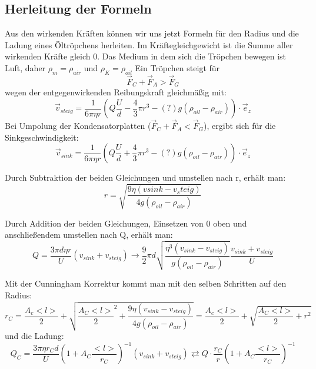 \documentclass{scrartcl}
\begin{document}
		\subsection{Herleitung der Formeln}
			Aus den wirkenden Kräften können wir uns jetzt Formeln für den Radius und die Ladung eines Öltröpchens herleiten.
			Im Kräftegleichgewicht ist die Summe aller wirkenden Kräfte gleich 0.
			Das Medium in dem sich die Tröpchen bewegen ist Luft, daher	$\rho_m  = \rho_{air}$ und $\rho_K = \rho_{oil}$
			Ein Tröpchen steigt für
			\begin{equation}
				\vec{F}_C + \vec{F}_A > \vec{F}_G
			\end{equation}
			wegen der entgegenwirkenden  Reibungskraft gleichmäßig mit:
			\begin{equation}
				\vec{v}_{steig} = \frac{1}{6\pi \eta r} (Q \frac{U}{d} - \frac{4}{3}\pi r^3 -(?)g (\rho_{oil}-\rho_{air})) \cdot \vec{e}_z
			\end{equation}
			Bei Umpolung der Kondensatorplatten ($\vec{F}_C + \vec{F}_A < \vec{F}_G$), ergibt sich für die Sinkgeschwindigkeit:
			\begin{equation}
				\vec{v}_{sink} = \frac{1}{6\pi \eta r} (Q \frac{U}{d} + \frac{4}{3}\pi r^3 -(?)g (\rho_{oil}-\rho_{air})) \cdot \vec{e}_z
			\end{equation}

			Durch Subtraktion der beiden Gleichungen und umstellen nach r, erhält man:
			\begin{equation}
				r = \sqrt{\frac{9 \eta (v{sink} - v_steig)}{4 g (\rho_{oil} - \rho_{air})}}
			\end{equation}

			Durch Addition der beiden Gleichungen, Einsetzen von 0 oben und anschließendem umstellen nach Q, erhält man:
			\begin{equation}
				Q = \frac{3 \pi d \eta r}{U} (v_{sink} + v_{steig})
				\rightarrow \frac{9}{2} \pi d \sqrt{\frac{\eta^3 (v_{sink} - v_{steig})}{g (\rho_{oil} - \rho_{air})}} \frac{v_{sink} + v_{steig}}{U} 
			\end{equation}

			Mit der Cunningham Korrektur kommt man mit den selben Schritten auf den Radius:
			\begin{equation}
				r_C = \frac{A_c <l>}{2} + \sqrt{\frac{A_C <l>}{2}^2 +\frac{9 \eta (v_{sink} - v_{steig})}{4 g (\rho_{oil} - \rho_{air})}}
					= \frac{A_c <l>}{2} + \sqrt{\frac{A_C <l>}{2} + r^2}
			\end{equation}
			und die Ladung:
			\begin{equation}
				Q_C = \frac{3 \pi \eta r_C d}{U} (1 + A_C \frac{<l>}{r_C})^{-1} (v_{sink} + v_{steig})
				\rightleftarrows Q \cdot \frac{r_C}{r} (1 + A_C \frac{<l>}{r_C})^{-1} 
			\end{equation}
\end{document}
